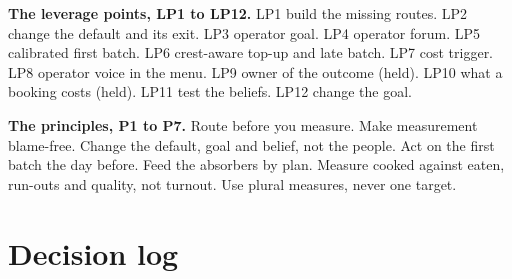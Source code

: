 \documentclass[
  11pt,
  table]{article}
\begin{document}
\textbf{The leverage points, LP1 to LP12.} LP1 build the missing routes. LP2 change the default and its exit. LP3 operator goal. LP4 operator forum. LP5 calibrated first batch. LP6 crest-aware top-up and late batch. LP7 cost trigger. LP8 operator voice in the menu. LP9 owner of the outcome (held). LP10 what a booking costs (held). LP11 test the beliefs. LP12 change the goal.

\textbf{The principles, P1 to P7.} Route before you measure. Make measurement blame-free. Change the default, goal and belief, not the people. Act on the first batch the day before. Feed the absorbers by plan. Measure cooked against eaten, run-outs and quality, not turnout. Use plural measures, never one target.

\section{Decision log}\label{decision-log}
\end{document}
